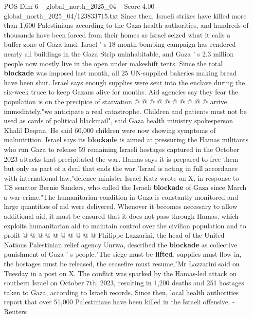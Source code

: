 \begin{textsample}{POS Dim 6 – global\_north\_2025\_04 – Score 4.00 – global\_north\_2025\_04/123833715.txt}
Since then, Israeli strikes have killed more than 1,600 Palestinians according to the Gaza health authorities, and hundreds of thousands have been forced from their homes as Israel seized what it calls a buffer zone of Gaza land.
Israel ' s 18-month bombing campaign has rendered nearly all buildings in the Gaza Strip uninhabitable, and Gaza ' s 2.3 million people now mostly live in the open under makeshift tents.
Since the total \textbf{blockade} was imposed last month, all 25 UN-supplied bakeries making bread have been shut.
Israel says enough supplies were sent into the enclave during the six-week truce to keep Gazans alive for months.
Aid agencies say they fear the population is on the precipice of starvation @ @ @ @ @ @ @ @ @ @ arrive immediately,"we anticipate a real catastrophe.
Children and patients must not be used as cards of political blackmail", said Gaza health ministry spokesperson Khalil Deqran.
He said 60,000 children were now showing symptoms of malnutrition.
Israel says its \textbf{blockade} is aimed at pressuring the Hamas militants who run Gaza to release 59 remaining Israeli hostages captured in the October 2023 attacks that precipitated the war.
Hamas says it is prepared to free them but only as part of a deal that ends the war."Israel is acting in full accordance with international law,"defence minister Israel Katz wrote on X, in response to US senator Bernie Sanders, who called the Israeli \textbf{blockade} of Gaza since March a war crime."The humanitarian condition in Gaza is constantly monitored and large quantities of aid were delivered.
Whenever it becomes necessary to allow additional aid, it must be ensured that it does not pass through Hamas, which exploits humanitarian aid to maintain control over the civilian population and to profit @ @ @ @ @ @ @ @ @ @ Philippe Lazzarini, the head of the United Nations Palestinian relief agency Unrwa, described the \textbf{blockade} as collective punishment of Gaza ' s people."The siege must be \textbf{lifted}, supplies must flow in, the hostages must be released, the ceasefire must resume,"Mr Lazzarini said on Tuesday in a post on X.
The conflict was sparked by the Hamas-led attack on southern Israel on October 7th, 2023, resulting in 1,200 deaths and 251 hostages taken to Gaza, according to Israeli records.
Since then, local health authorities report that over 51,000 Palestinians have been killed in the Israeli offensive. - Reuters

\end{textsample}
